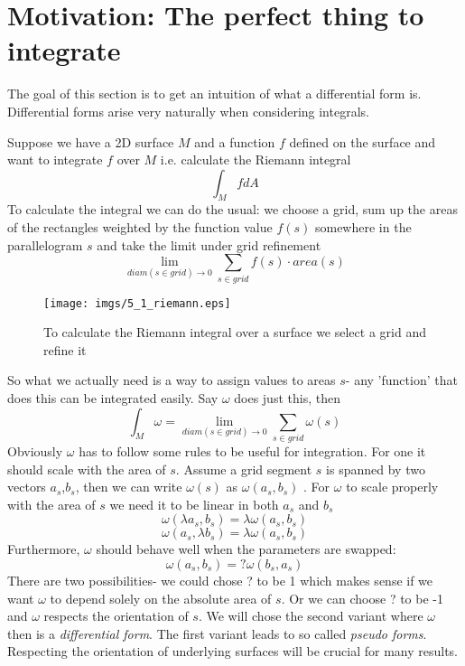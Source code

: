 \section{Motivation: The perfect thing to integrate}


The goal of this section is to get an intuition of what a differential form is. Differential forms arise very naturally when considering integrals. 

Suppose we have a 2D surface $M$ and a function $f$ defined on the surface and want to integrate $f$ over $M$ i.e. calculate the Riemann integral
\[\int_{M} f dA\]
To calculate the integral we can do the usual: we choose a grid, sum up the areas of the rectangles weighted by the  function value $f(s)$ somewhere in the parallelogram $s$ and take the limit under grid refinement
\[\lim_{diam(s\in grid)\rightarrow 0} \sum_{s \in grid} f(s)\cdot area(s) \]

\begin{figure}
\begin{center}
\texttt{[image: imgs/5\_1\_riemann.eps]}
\end{center}
\vspace{-1cm}
\caption{To calculate the Riemann integral over a surface we select a grid and refine it }
\end{figure}

So what we actually need is a way to assign values to areas $s$- any 'function' that does this can be integrated easily. Say $\omega$ does just this, then
\[\int_M \omega = \lim_{diam(s\in grid)\rightarrow 0} \sum_{s \in grid} \omega(s)\]
Obviously $\omega$ has to follow some rules to be useful for integration. For one it should scale with the area of $s$. Assume a grid segment $s$ is spanned by two vectors $a_s$,$b_s$, then we can write $\omega(s)$ as $\omega(a_s,b_s)$ . For $\omega$ to scale properly with the area of $s$ we need it to be linear in both $a_s$ and $b_s$
\[\omega(\lambda a_s, b_s) =\lambda \omega(a_s,b_s)\]
\[\omega(a_s , \lambda b_s) =\lambda \omega(a_s,b_s)\]
Furthermore, $\omega$ should behave well when the parameters are swapped:
\[\omega(a_s,b_s) = ? \omega(b_s,a_s)\]
There are two possibilities- we could chose ? to be 1 which makes sense if we want $\omega$ to depend solely on the absolute area of $s$. Or we can choose ? to be -1 and $\omega$ respects the orientation of $s$. We will chose the second variant where $\omega$ then is a \emph{differential form}. The first variant leads to so called \emph{pseudo forms}. Respecting the orientation of underlying surfaces will be crucial for many results.

